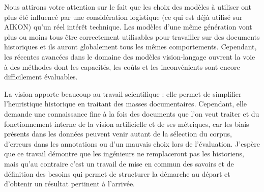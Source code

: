 
Nous attirons votre attention sur le fait que les choix des modèles à utiliser ont plus été influencé par une considération logistique (ce qui est déjà utilisé sur AIKON) qu'un réel intérêt technique. Les modèles d'une même génération vont plus ou moins tous être correctement utilisables pour travailler sur des documents historiques et ils auront globalement tous les mêmes comportements. Cependant, les récentes avancées dans le domaine des modèles vision-langage ouvrent la voie à des méthodes dont les capacités, les coûts et les inconvénients sont encore difficilement évaluables. 

La vision apporte beaucoup au travail scientifique : elle permet de simplifier l'heuristique historique en traitant des masses documentaires. Cependant, elle demande une connaissance fine à la fois des documents que l'on veut traiter et du fonctionnement interne de la vision artificielle et de ses métriques, car les biais présents dans les données peuvent venir autant de la sélection du corpus, d'erreurs dans les annotations ou d'un mauvais choix lors de l'évaluation. J'espère que ce travail démontre que les ingénieurs ne remplaceront pas les historiens, mais qu'au contraire c'est un travail de mise en commun des savoirs et de définition des besoins qui permet de structurer la démarche au départ et d'obtenir un résultat pertinent à l'arrivée.